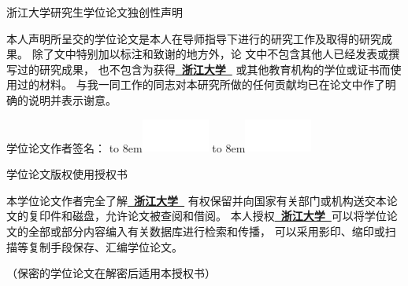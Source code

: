   \vspace*{-2mm}

  {\fangsong

  \begin{center}
    {\noindent\fangsong{}浙江大学研究生学位论文独创性声明}\\
  \end{center}

  {\setlength{\baselineskip}{1.3\baselineskip}
  本人声明所呈交的学位论文是本人在导师指导下进行的研究工作及取得的研究成果。
  除了文中特别加以标注和致谢的地方外，论
  文中不包含其他人已经发表或撰写过的研究成果，
  也不包含为获得{\bfseries\kaishu{}\underline{~浙江大学~}}
  或其他教育机构的学位或证书而使用过的材料。
  与我一同工作的同志对本研究所做的任何贡献均已在论文中作了明确的说明并表示谢意。

  \vspace{10ex}

  {\fangsong{}学位论文作者签名：
  \ifpdf
  {\hbox to 8em{\includegraphics[width=6em,height=3em]{./Signature/sign_cr_1.pdf}}}
  \else
  {\hbox to 8em{\includegraphics[width=6em,height=3em]{./Signature/sign_cr_1.eps}}}
  \fi
  \PutsigndateA}
  
  \vspace{12ex}

  \begin{center}
    {\noindent\fangsong{}学位论文版权使用授权书}
  \end{center}

  本学位论文作者完全了解{\bfseries\kaishu{}\underline{~浙江大学~}}
  有权保留并向国家有关部门或机构送交本论文的复印件和磁盘，允许论文被查阅和借阅。
  本人授权{\bfseries\kaishu{}\underline{~浙江大学~}}可以将学位论文的全部或部分内容编入有关数据库进行检索和传播，
  可以采用影印、缩印或扫描等复制手段保存、汇编学位论文。

  （保密的学位论文在解密后适用本授权书）

  \vspace{2ex}

}}

